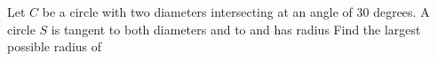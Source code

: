 Let $C$ be a circle with two diameters intersecting at an angle of $30$ degrees. A circle $S$ is tangent to both diameters and to  and has radius  Find the largest possible radius of 